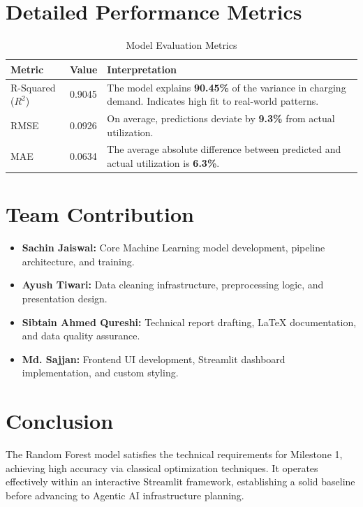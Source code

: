 \documentclass{article}
\begin{document}
\section{Detailed Performance Metrics}

\begin{table}[h]
    \centering
    \begin{tabular}{@{}llp{8cm}@{}}
        \toprule
        \textbf{Metric} & \textbf{Value} & \textbf{Interpretation} \\
        \midrule
        R-Squared ($R^2$) & 0.9045 & The model explains \textbf{90.45\%} of the variance in charging demand. Indicates high fit to real-world patterns. \\
        RMSE & 0.0926 & On average, predictions deviate by \textbf{9.3\%} from actual utilization. \\
        MAE & 0.0634 & The average absolute difference between predicted and actual utilization is \textbf{6.3\%}. \\
        \bottomrule
    \end{tabular}
    \caption{Model Evaluation Metrics}
    \label{tab:metrics}
\end{table}

\section{Team Contribution}
\begin{itemize}
    \item \textbf{Sachin Jaiswal:} Core Machine Learning model development, pipeline architecture, and training.
    \item \textbf{Ayush Tiwari:} Data cleaning infrastructure, preprocessing logic, and presentation design.
    \item \textbf{Sibtain Ahmed Qureshi:} Technical report drafting, LaTeX documentation, and data quality assurance.
    \item \textbf{Md. Sajjan:} Frontend UI development, Streamlit dashboard implementation, and custom styling.
\end{itemize}

\section{Conclusion}
The Random Forest model satisfies the technical requirements for Milestone 1, achieving high accuracy via classical optimization techniques. It operates effectively within an interactive Streamlit framework, establishing a solid baseline before advancing to Agentic AI infrastructure planning.
\end{document}
